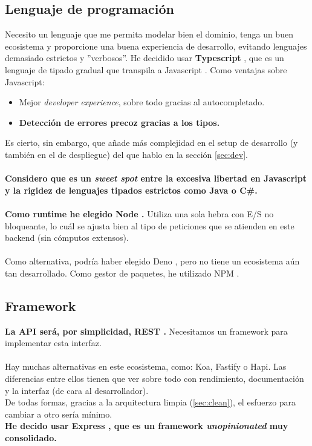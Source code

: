 \subsection{Lenguaje de programación}
Necesito un lenguaje que me permita modelar bien el dominio, tenga un buen ecosistema y proporcione una buena experiencia de desarrollo, evitando lenguajes demasiado estrictos y ''verbosos''.
He decidido usar \textbf{Typescript} \cite{typescript}, que es un lenguaje de tipado gradual que transpila \cite{transpiler} a Javascript \cite{javascript}.
Como ventajas sobre Javascript:
\begin{itemize}
	\item Mejor \textit{developer experience}, sobre todo gracias al autocompletado.
	\item \textbf{Detección de errores precoz gracias a los tipos.}
\end{itemize}
Es cierto, sin embargo, que añade más complejidad en el setup de desarrollo (y también en el de despliegue) del que hablo en la sección \ref{sec:dev}. \\ \\
\textbf{Considero que es un \textit{sweet spot} entre la excesiva libertad en Javascript y la rigidez de lenguajes tipados estrictos como Java o C\#.} \\ \\

\textbf{Como runtime he elegido Node \cite{nodejs}.} Utiliza una sola hebra con E/S no bloqueante, lo cuál se ajusta bien al tipo 
de peticiones que se atienden en este backend (sin cómputos extensos).  \\ \\
Como alternativa, podría haber elegido Deno \cite{deno}, pero no tiene un ecosistema aún tan desarrollado.
Como gestor de paquetes, he utilizado NPM \cite{npm}.

\subsection{Framework}
\textbf{La API será, por simplicidad, REST \cite{rest}.} Necesitamos un framework para implementar esta interfaz. \\\\
Hay muchas alternativas en este ecosistema, como: Koa, Fastify o Hapi. Las diferencias entre ellos tienen que ver sobre todo con rendimiento, documentación y la interfaz (de cara al desarrollador). \\
De todas formas, gracias a la arquitectura limpia (\ref{sec:clean}), el esfuerzo
para cambiar a otro sería mínimo. \\
\textbf{He decido usar Express \cite{express}, que es un framework \textit{unopinionated} muy consolidado.} 


